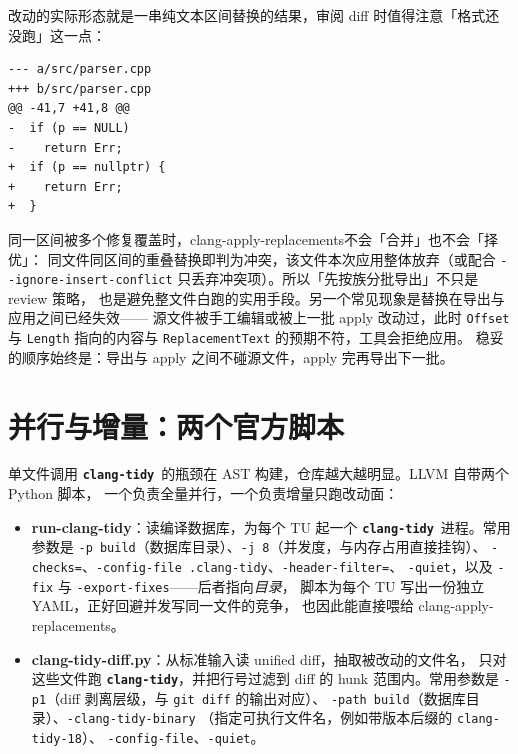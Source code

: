 \documentclass[12pt,a4paper,fontset=fandol]{ctexbook}
\newcommand{\Opt}[1]{\texttt{-\/-#1}}
\newcommand{\Bk}{\discretionary{}{}{}}
\newcommand{\Lib}[1]{\textbf{\texttt{#1}}}
\newcommand{\Tidy}{\Lib{clang-tidy}}
\newcommand{\Fmt}{\Lib{clang-format}}
\begin{document}
改动的实际形态就是一串纯文本区间替换的结果，审阅 diff 时值得注意「格式还没跑」这一点：

\begin{lstlisting}[style=diffstyle,caption={应用之后、尚未运行 \Fmt\ 时的典型形态},label={lst:ch14-diff}]
--- a/src/parser.cpp
+++ b/src/parser.cpp
@@ -41,7 +41,8 @@
-  if (p == NULL)
-    return Err;
+  if (p == nullptr) {
+    return Err;
+  }
\end{lstlisting}

\begin{note}[title={apply-replacements 的冲突处理}]
同一区间被多个修复覆盖时，\Bk clang-apply-replacements\Bk 不会「合并」也不会「择优」：
同文件同区间的重叠替换即判为冲突，该文件本次应用整体放弃（或配合
\Opt{ignore-insert-conflict} 只丢弃冲突项）。所以「先按族分批导出」不只是 review 策略，
也是避免整文件白跑的实用手段。另一个常见现象是替换在导出与应用之间已经失效——
源文件被手工编辑或被上一批 apply 改动过，此时 \texttt{Offset} 与 \texttt{Length}
指向的内容与 \texttt{ReplacementText} 的预期不符，工具会拒绝应用。
稳妥的顺序始终是：导出与 apply 之间不碰源文件，apply 完再导出下一批。
\end{note}

\section{并行与增量：两个官方脚本}\label{sec:ch14-s3}

单文件调用 \Tidy\ 的瓶颈在 AST 构建，仓库越大越明显。LLVM 自带两个 Python 脚本，
一个负责全量并行，一个负责增量只跑改动面：

\begin{itemize}
  \item \textbf{run-clang-tidy}：读编译数据库，为每个 TU 起一个 \Tidy\ 进程。常用参数是
    \texttt{-p build}（数据库目录）、\texttt{-j 8}（并发度，与内存占用直接挂钩）、
    \texttt{-checks=}、\texttt{-config-file .clang-tidy}、\texttt{-header-filter=}、
    \texttt{-quiet}，以及 \texttt{-fix} 与 \texttt{-export-fixes}——后者指向\emph{目录}，
    脚本为每个 TU 写出一份独立 YAML，正好回避并发写同一文件的竞争，
    也因此能直接喂给 \Bk clang-apply-replacements\Bk。
  \item \textbf{clang-tidy-diff.py}：从标准输入读 unified diff，抽取被改动的文件名，
    只对这些文件跑 \Tidy，并把行号过滤到 diff 的 hunk 范围内。常用参数是
    \texttt{-p1}（diff 剥离层级，与 \texttt{git diff} 的输出对应）、
    \texttt{-path build}（数据库目录）、\texttt{-clang-tidy-binary}
    （指定可执行文件名，例如带版本后缀的 \texttt{clang-tidy-18}）、
    \texttt{-config-file}、\texttt{-quiet}。
\end{itemize}
\end{document}
